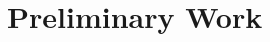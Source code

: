        
        
    
        
        
    
    \section{Preliminary Work}
    \label{sec:Preliminary_Work}

